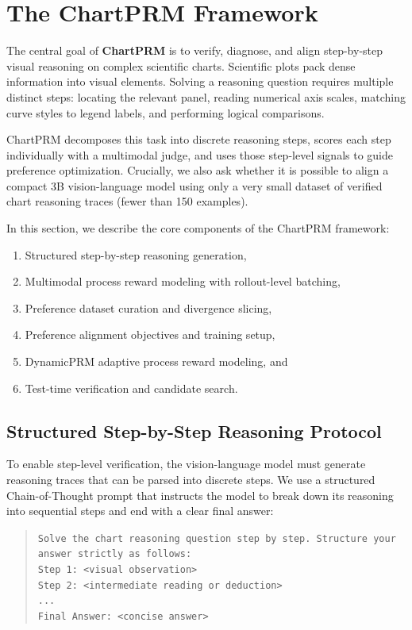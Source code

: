 \documentclass[11pt]{article}
\begin{document}
\section{The ChartPRM Framework}
\label{sec:chartprm_framework}

The central goal of \textbf{ChartPRM} is to verify, diagnose, and align step-by-step visual reasoning on complex scientific charts. Scientific plots pack dense information into visual elements. Solving a reasoning question requires multiple distinct steps: locating the relevant panel, reading numerical axis scales, matching curve styles to legend labels, and performing logical comparisons.

ChartPRM decomposes this task into discrete reasoning steps, scores each step individually with a multimodal judge, and uses those step-level signals to guide preference optimization. Crucially, we also ask whether it is possible to align a compact 3B vision-language model using only a very small dataset of verified chart reasoning traces (fewer than 150 examples).

In this section, we describe the core components of the ChartPRM framework:
\begin{enumerate}[noitemsep,topsep=0pt]
    \item Structured step-by-step reasoning generation,
    \item Multimodal process reward modeling with rollout-level batching,
    \item Preference dataset curation and divergence slicing,
    \item Preference alignment objectives and training setup,
    \item DynamicPRM adaptive process reward modeling, and
    \item Test-time verification and candidate search.
\end{enumerate}

\subsection{Structured Step-by-Step Reasoning Protocol}
\label{subsec:reasoning_protocol}
To enable step-level verification, the vision-language model must generate reasoning traces that can be parsed into discrete steps. We use a structured Chain-of-Thought prompt \citep{wei2022cot} that instructs the model to break down its reasoning into sequential steps and end with a clear final answer:
\begin{quote}
\small
\texttt{Solve the chart reasoning question step by step. Structure your answer strictly as follows:\\
Step 1: <visual observation>\\
Step 2: <intermediate reading or deduction>\\
...\\
Final Answer: <concise answer>}
\end{quote}
\end{document}
